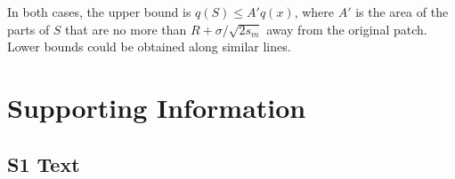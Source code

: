 \documentclass[10pt,letterpaper]{article}
\begin{document}
In both cases,
the upper bound is $q(S) \le A' q(x)$,
where $A'$ is the area of the parts of $S$ that are no more than $R+\sigma/\sqrt{2s_m}$ away from the original patch.
Lower bounds could be obtained along similar lines.




% 
% 
% 
% 

\appendix
\renewcommand{\thesubsection}{S\arabic{subsection}}
\setcounter{secnumdepth}{2}

\section*{Supporting Information}

\subsection*{S1 Text}
\label{apx:elliptic_integrals}
\end{document}
